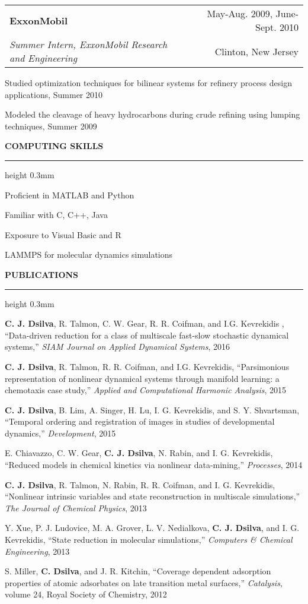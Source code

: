 \documentclass[letterpaper,10pt]{article}
\makeatletter
\newenvironment{itemize*}
  {\begin{itemize}
    \setlength{\parskip}{-2pt}}
  {\end{itemize}}
\newcommand{\cvheading}[1]{
\vspace{0.11in}
\noindent
\MakeUppercase{\bf #1}
\vspace{0.06in}
{\hrule height 0.3mm}
\vspace{0.06in}}
\newcommand{\workplace}[4]{
\noindent
\vspace{0.012in}
\begin{tabular*}{1.0\textwidth}{@{\extracolsep{\fill}} l r}
{\bf #1} & #2\\
{\em #3} & #4\\
\end{tabular*}
\vspace{-0.15in}
}
\makeatother
\begin{document}
\workplace{ExxonMobil}{May-Aug. 2009, June-Sept. 2010}{Summer Intern, ExxonMobil Research and Engineering}{Clinton, New Jersey}
\begin{itemize*}
\item Studied optimization techniques for bilinear systems for refinery process design applications, Summer 2010
\item Modeled the cleavage of heavy hydrocarbons during crude refining using lumping techniques, Summer 2009
\end{itemize*}

\cvheading{Computing Skills}
\begin{itemize*}
\item Proficient in MATLAB and Python
\item Familiar with C, C++, Java
\item Exposure to Visual Basic and R
\item LAMMPS for molecular dynamics simulations
\end{itemize*}


\cvheading{Publications}
\begin{itemize*}
\item {\bf C. J. Dsilva}, R. Talmon, C. W. Gear, R. R. Coifman, and I.G. Kevrekidis , ``Data-driven reduction for a class of multiscale fast-slow stochastic dynamical systems,'' {\em SIAM Journal on Applied Dynamical Systems}, 2016
\item {\bf C. J. Dsilva}, R. Talmon, R. R. Coifman, and I.G. Kevrekidis, ``Parsimonious representation of nonlinear dynamical systems through manifold learning: a chemotaxis case study,'' {\em Applied and Computational Harmonic Analysis}, 2015
\item {\bf C. J. Dsilva}, B. Lim, A. Singer, H. Lu, I. G. Kevrekidis, and S. Y. Shvartsman, ``Temporal ordering and registration of images in studies of developmental dynamics,'' {\em Development}, 2015
\item E. Chiavazzo, C. W. Gear, {\bf C. J. Dsilva}, N. Rabin, and I. G. Kevrekidis, ``Reduced models in chemical kinetics via nonlinear data-mining,'' {\em Processes}, 2014
\item {\bf C. J. Dsilva}, R. Talmon, N. Rabin, R. R. Coifman, and I. G. Kevrekidis, ``Nonlinear intrinsic variables and state reconstruction in multiscale simulations,''
{\em The Journal of Chemical Physics}, 2013
\item Y. Xue, P. J. Ludovice, M. A. Grover, L. V. Nedialkova, {\bf C. J. Dsilva}, and I. G. Kevrekidis, ``State reduction in molecular simulations,'' {\em Computers \& Chemical Engineering}, 2013
\item S. Miller, {\bf C. Dsilva}, and J. R. Kitchin, ``Coverage dependent adsorption properties of atomic adsorbates on late transition metal surfaces,'' {\em Catalysis}, volume 24, Royal Society of Chemistry, 2012
\end{itemize*}
\end{document}
